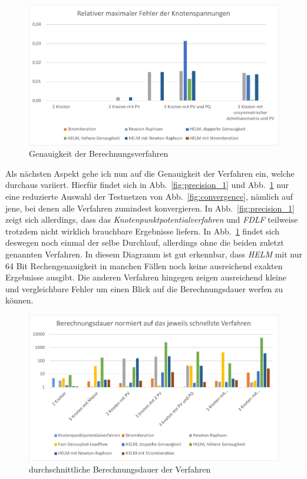 \documentclass[12pt,a4paper]{article}
\newcommand{\reffig}[1]{{Abb.~\ref{fig:#1}}}
\begin{document}
	\begin{figure}
		\centering
		\includegraphics[scale=0.8]{pictures/precision_2}
		\caption{Genauigkeit der Berechnungsverfahren}
		\label{fig:precision_2}
	\end{figure}
	
	Als nächsten Aspekt gehe ich nun auf die Genauigkeit der Verfahren ein, welche durchaus variiert. Hierfür findet sich in \reffig{precision_1} und \reffig{precision_2} nur eine reduzierte Auswahl der Testnetzen von \reffig{convergence}, nämlich auf jene, bei denen alle Verfahren zumindest konvergieren. In \reffig{precision_1} zeigt sich allerdings, dass das \emph{Knotenpunktpotentialverfahren} und \emph{FDLF} teilweise trotzdem nicht wirklich brauchbare Ergebnisse liefern. In \reffig{precision_2} findet sich deswegen noch einmal der selbe Durchlauf, allerdings ohne die beiden zuletzt genannten Verfahren. In diesem Diagramm ist gut erkennbar, dass \emph{HELM} mit nur 64 Bit Rechengenauigkeit in manchen Fällen noch keine ausreichend exakten Ergebnisse ausgibt. Die anderen Verfahren hingegen zeigen ausreichend kleine und vergleichbare Fehler um einen Blick auf die Berechnungsdauer werfen zu können.
	
	\begin{figure}
		\centering
		\includegraphics[scale=0.8]{pictures/duration_mean}
		\caption{durchschnittliche Berechnungsdauer der Verfahren}
		\label{fig:duration_mean}
	\end{figure}
	
\end{document}
